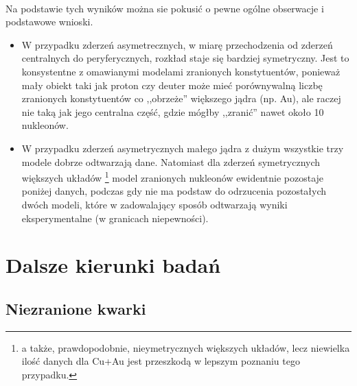 \documentclass[a4paper,12pt]{article}
\begin{document}
\paragraph{}
Na podstawie tych wyników można sie pokusić o pewne ogólne obserwacje i podstawowe wnioski. 
\begin{itemize}
\item W przypadku zderzeń asymetrecznych, w miarę przechodzenia od zderzeń centralnych do peryferycznych, rozkład staje się bardziej symetryczny. Jest to konsystentne z omawianymi modelami zranionych konstytuentów, ponieważ mały obiekt taki jak proton czy deuter może mieć porównywalną liczbę zranionych konstytuentów co ,,obrzeże'' większego jądra (np. Au), ale raczej nie taką jak jego centralna część, gdzie mógłby ,,zranić'' nawet około 10 nukleonów.
\item W przypadku zderzeń asymetrycznych małego jądra z dużym wszystkie trzy modele dobrze odtwarzają dane. Natomiast dla zderzeń symetrycznych większych układów \footnote{a także, prawdopodobnie, nieymetrycznych większych układów, lecz niewielka ilość danych dla Cu+Au jest przeszkodą w lepszym poznaniu tego przypadku.} model zranionych nukleonów ewidentnie pozostaje poniżej danych, podczas gdy nie ma podstaw do odrzucenia pozostałych dwóch modeli, które w zadowalający sposób odtwarzają wyniki eksperymentalne (w granicach niepewności).
\end{itemize}

\newpage
\section{Dalsze kierunki badań}
\subsection{Niezranione kwarki}
\end{document}
